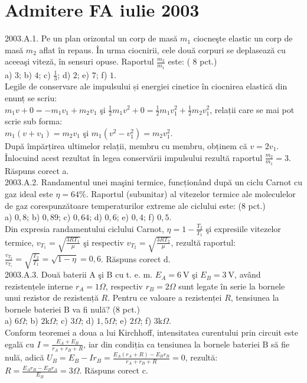 \section{Admitere FA iulie 2003}

2003.A.1. Pe un plan orizontal un corp de masă $m_{1}$ ciocneşte elastic un corp de masă $m_{2}$ aflat în repaus. În urma ciocnirii, cele două corpuri se deplasează cu aceeaşi viteză, în sensuri opuse. Raportul $\frac{m_{2}}{m_{1}}$ este: ( 8 pct.)\\ a) $3$; b) $4$; c) $\frac{1}{3}$; d) $2$; e) $7$; f) $1$.\\ Legile de conservare ale impulsului și energiei cinetice în ciocnirea elastică din enunț se scriu:\\ $m_{1} v+0=-m_{1} v_{1}+m_{2} v_{1}$ şi $\frac{1}{2} m_{1} v^{2}+0=\frac{1}{2} m_{1} v_{1}^{2}+\frac{1}{2} m_{2} v_{1}^{2}$, relații care se mai pot scrie sub forma:\\ $m_{1}\left(v+v_{1}\right)=m_{2} v_{1}$ şi $m_{1}\left(v^{2}-v_{1}^{2}\right)=m_{2} v_{1}^{2}$.\\ După împărțirea ultimelor relații, membru cu membru, obținem că $v=2 v_{1}$. Înlocuind acest rezultat în legea conservării impulsului rezultă raportul $\frac{m_{2}}{m_{1}}=3$. Răspuns corect a.\\

2003.A.2. Randamentul unei maşini termice, funcționând după un ciclu Carnot cu gaz ideal este $\eta=64 \%$. Raportul (subunitar) al vitezelor termice ale moleculelor de gaz corespunzătoare temperaturilor extreme ale ciclului este: (8 pct.)\\ a) $0,8$; b) $0,89$; c) $0,64$; d) $0,6$; e) $0,4$; f) $0,5$.\\ Din expresia randamentului ciclului Carnot, $\eta=1-\frac{T_{2}}{T_{1}}$ şi expresiile vitezelor termice, $v_{T_{1}}=\sqrt{\frac{3 R T_{1}}{\mu}}$ şi respectiv $v_{T_{2}}=\sqrt{\frac{3 R T_{2}}{\mu}}$, rezultă raportul:\\ $\frac{v_{T_{2}}}{v_{T_{1}}}=\sqrt{\frac{T_{2}}{T_{1}}}=\sqrt{1-\eta}=0,6$. Răspuns corect d.\\

2003.A.3. Două baterii A şi B cu t. e. m. $E_{A}=6 \mathrm{~V}$ şi $E_{B}=3 \mathrm{~V}$, având rezistențele interne $r_{A}=1 \Omega$, respectiv $r_{B}=2 \Omega$ sunt legate în serie la bornele unui rezistor de rezistență $R$. Pentru ce valoare a rezistenței $R$, tensiunea la bornele bateriei B va fi nulă? (8 pct.)\\ a) $6 \Omega$; b) $2 \mathrm{k} \Omega$; c) $3 \Omega$; d) $1,5 \Omega$; e) $2 \Omega$; f) $3 \mathrm{k} \Omega$.\\ Conform teoremei a doua a lui Kirchhoff, intensitatea curentului prin circuit este egală cu $I=\frac{E_{A}+E_{B}}{r_{A}+r_{B}+R}$, iar din condiția ca tensiunea la bornele bateriei B să fie nulă, adică $U_{B}=E_{B}-I r_{B}=\frac{E_{A}\left(r_{A}+R\right)-E_{B} r_{B}}{r_{A}+r_{B}+R}=0$, rezultă:\\ $R=\frac{E_{A} r_{B}-E_{B} r_{A}}{E_{B}}=3 \Omega$. Răspuns corect c.\\

